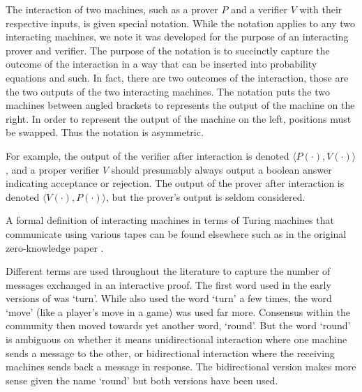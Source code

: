 
\begin{remark}

    The interaction of two machines, such as a prover $P$ and a verifier $V$ with their respective inputs, is given special notation.
    While the notation applies to any two interacting machines, we note it was developed for the purpose of an interacting prover and verifier.
    The purpose of the notation is to succinctly capture the outcome of the interaction in a way that can be inserted into probability equations and such.
    In fact, there are two outcomes of the interaction, those are the two outputs of the two interacting machines.
    The notation puts the two machines between angled brackets to represents the output of the machine on the right.
    In order to represent the output of the machine on the left, positions must be swapped.
    Thus the notation is asymmetric.

    For example, the output of the verifier after interaction is denoted $\langle P(\cdot),V(\cdot)\rangle$, and a proper verifier $V$ should presumably always output a boolean answer indicating acceptance or rejection.
    The output of the prover after interaction is denoted $\langle V(\cdot),P(\cdot)\rangle$, but the prover's output is seldom considered.

    A formal definition of interacting machines in terms of Turing machines that communicate using various tapes can be found elsewhere such as in the original zero-knowledge paper \cite{GMR85}.
\end{remark}

\begin{remark}

    Different terms are used throughout the literature to capture the number of messages exchanged in an interactive proof.
    The first word used in the early versions of \cite{GMR85} was `turn'.
    While \cite{Bab85} also used the word `turn' a few times, the word `move' (like a player's move in a game) was used far more.
    Consensus within the community then moved towards yet another word, `round'.
    But the word `round' is ambiguous on whether it means unidirectional interaction where one machine sends a message to the other, or bidirectional interaction where the receiving machines sends back a message in response.
    The bidirectional version makes more sense given the name `round' but both versions have been used.
\end{remark}

